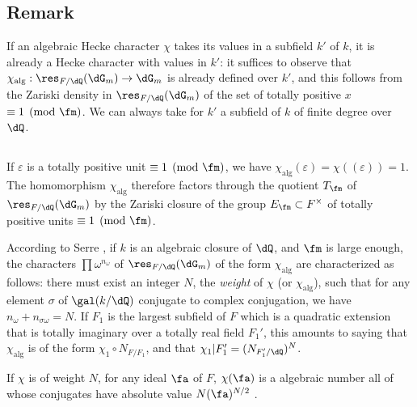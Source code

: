 \documentclass[oneside]{book}
\begin{document}
\subsection{Remark}\label{VI:5-4}

If an algebraic Hecke character $\chi$ takes its values in a 
subfield $k'$ of $k$, it is already a Hecke character with values in 
$k'$: it suffices to observe that $\chi_\text{alg}:\res_{F/\dQ}(\dG_m) \to \dG_m$ 
is already defined over $k'$, and this follows from the Zariski density 
in $\res_{F/\dQ}(\dG_m)$ of the set of totally positive $x$ 
$\equiv 1\pmod\fm$. We can always take for $k'$ a subfield of $k$ of 
finite degree over $\dQ$. 





\subsection{}\label{VI:5-5}

If $\varepsilon$ is a totally positive unit $\equiv 1\pmod\fm$, we have 
$\chi_\text{alg}(\varepsilon) = \chi((\varepsilon)) = 1$. The homomorphism 
$\chi_\text{alg}$ therefore factors through the quotient $T_\fm$ of 
$\res_{F/\dQ}(\dG_m)$ by the Zariski closure of the group 
$E_\fm\subset F^\times$ of totally positive units $\equiv 1\pmod\fm$. 

According to Serre \cite[II.3]{se68}, if $k$ is an algebraic closure of 
$\dQ$, and $\fm$ is large enough, the characters $\prod \omega^{n_\omega}$ 
of $\res_{F/\dQ}(\dG_m)$ of the form $\chi_\text{alg}$ are characterized 
as follows: there must exist an integer $N$, the \emph{weight} of $\chi$ (or 
$\chi_\text{alg}$), such that for any element $\sigma$ of $\gal(k/\dQ)$ 
conjugate to complex conjugation, we have $n_\omega+n_{\sigma \omega}=N$. If 
$F_1$ is the largest subfield of $F$ which is a quadratic extension 
that is totally imaginary over a totally real field $F_1'$, this amounts to 
  saying that $\chi_\text{alg}$ is of the form $\chi_1\circ N_{F/F_1}$, and that 
  $\chi_1|F_1'=(N_{F_1'/\dQ})^N$. 

If $\chi$ is of weight $N$, for any ideal $\fa$ of $F$, $\chi(\fa)$ is a 
algebraic number all of whose conjugates have absolute value 
$N(\fa)^{N/2}$ \cite[II.3 prop.2]{se68}. 





\subsection{}\label{VI:5-6}
\end{document}
